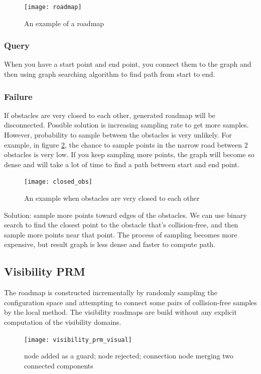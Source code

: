 \documentclass[11pt]{article}
\begin{document}
\begin{figure}[h]
\texttt{[image: roadmap]}
\centering
\caption{An example of a roadmap }
\label{fig:roadmap_example}
\end{figure}

\subsubsection{Query}
When you have a start point and end point, you connect them to the graph and then using graph searching algorithm to find path from start to end.

\subsubsection{Failure}
If obstacles are very closed to each other, generated roadmap will be disconnected. Possible solution is increasing sampling rate to get more samples. However, probability to sample between the obstacles is very unlikely. For example, in figure \ref{fig:closed_obs}, the chance to sample points in the narrow road between 2 obstacles is very low. If you keep sampling more points, the graph will become so dense and will take a lot of time to find a path between start and end point.\\
\begin{figure}
\texttt{[image: closed\_obs]}
\centering
\caption{An example when obstacles are very closed to each other}
\label{fig:closed_obs}
\end{figure}
Solution: sample more points toward edges of the obstacles. We can use binary search to find the closest point to the obstacle that's collision-free, and then sample more points near that point. The process of sampling becomes more expensive, but result graph is less dense and faster to compute path.

\subsection{Visibility PRM}
The roadmap is constructed incrementally by randomly sampling the configuration space and attempting to connect some pairs of collision-free samples by the local method.
The visibility roadmaps are build without any explicit computation of the visibility domains.
\begin{figure}[h]
\texttt{[image: visibility\_prm\_visual]}
\centering
\caption{node added as a guard; node rejected; connection node merging two connected components}
\label{fig:visprm_visual}
\end{figure}
\end{document}
